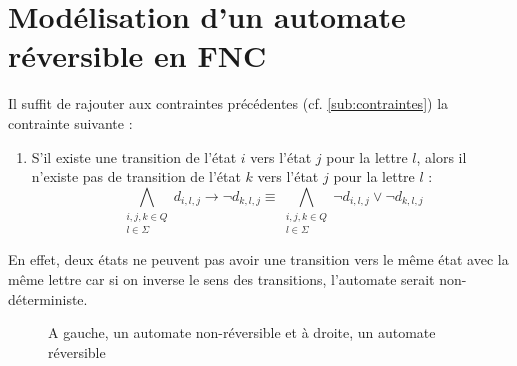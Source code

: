 \documentclass[a4paper, 12pt]{extarticle}
\begin{document}
\section{Modélisation d'un automate réversible en FNC}
\noindent Il suffit de rajouter aux contraintes précédentes (cf. \ref{sub:contraintes}) la contrainte suivante :
\begin{enumerate}
    \item S'il existe une transition de l'état $i$ vers l'état $j$ pour la lettre $l$, alors il n'existe pas de transition de l'état $k$ vers l'état $j$ pour la lettre $l$ :
    \begin{equation*}
        \bigwedge_{\substack{i,j,k \in Q\\l \in \Sigma}} d_{i,l,j} \rightarrow \neg d_{k,l,j}\equiv
        \bigwedge_{\substack{i,j,k \in Q\\l \in \Sigma}} \neg d_{i,l,j} \vee \neg d_{k,l,j}
    \end{equation*}
\end{enumerate}
En effet, deux états ne peuvent pas avoir une transition vers le même état avec la même lettre car si on inverse le sens des transitions,
l'automate serait non-déterministe.

\begin{figure}[H]
    \centering
    \hspace{4cm}
    \caption{A gauche, un automate non-réversible et à droite, un automate réversible}
\end{figure}
    
\end{document}
